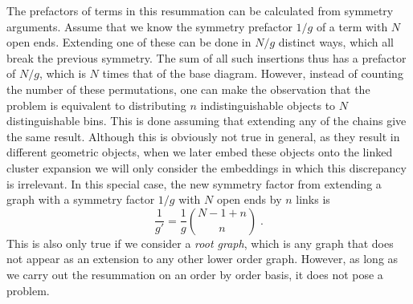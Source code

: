 %
The prefactors of terms in this resummation can be calculated from symmetry
arguments.  Assume that we know the symmetry prefactor $1/g$ of a term with $N$
open ends.  Extending one of these can be done in $N/g$ distinct ways, which all
break the previous symmetry. The sum of all such insertions thus has a prefactor
of $N/g$, which is $N$ times that of the base diagram.  However, instead of
counting the number of these permutations, one can make the observation that the
problem is equivalent to distributing $n$ indistinguishable objects to $N$
distinguishable bins. This is done assuming that extending any of the chains
give the same result. Although this is obviously not true in general, as they
result in different geometric objects, when we later embed these objects onto
the linked cluster expansion we will only consider the embeddings in which this
discrepancy is irrelevant. In this special case, the new symmetry factor from
extending a graph with a symmetry factor $1/g$ with $N$ open ends by $n$ links
is
%
\begin{equation} \label{eq:resummed_symmetry}
  \frac{1}{g'} = \frac{1}{g} \binom{N - 1 + n}{n}\;.
\end{equation}
%
This is also only true if we consider a \emph{root graph}, which is any graph
that does not appear as an extension to any other lower order graph.
However, as long as we carry out the resummation on an order by order basis, it
does not pose a problem.

